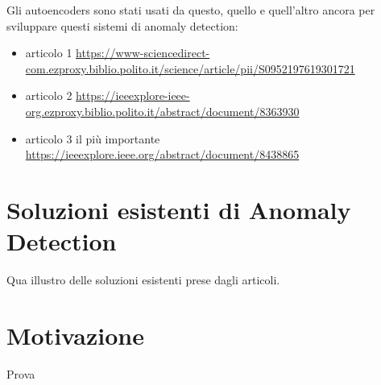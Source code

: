Gli autoencoders sono stati usati da questo, quello e quell'altro ancora per sviluppare questi sistemi di anomaly detection:
\begin{itemize}
    \item articolo 1  \url{https://www-sciencedirect-com.ezproxy.biblio.polito.it/science/article/pii/S0952197619301721}
    \item articolo 2 \url{https://ieeexplore-ieee-org.ezproxy.biblio.polito.it/abstract/document/8363930}
    \item articolo 3 il più importante \url{https://ieeexplore.ieee.org/abstract/document/8438865}
\end{itemize}

\section{Soluzioni esistenti di Anomaly Detection}

Qua illustro delle soluzioni esistenti prese dagli articoli.

\section{Motivazione}
Prova 



